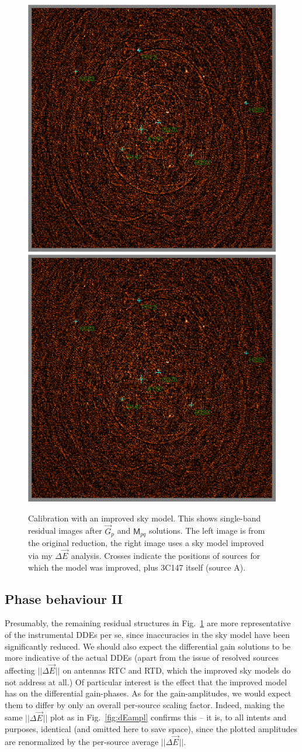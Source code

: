 \documentclass[]{aa}
\newcommand{\jones}[2]{\vec {#1}_{#2}}
\newcommand{\coh}[2]{\mathsf{{#1}}_{{#2}}}
\begin{document}
\begin{figure}
\begin{centering}
\includegraphics[width=.5\columnwidth]{spw2_oldmodel}%
\includegraphics[width=.5\columnwidth]{spw2_newmodel}\par
\end{centering}
\caption{\label{fig:residuals-newmodel}Calibration with an improved sky model. This shows single-band residual images after $\jones{G}{p}$ and $\coh{M}{pq}$ solutions. The left image is from the original reduction, the right image uses a sky model improved via my $\Delta\jones{E}{}$ analysis. Crosses indicate the positions of sources for which the model was improved, plus 3C147 itself (source A).}
\end{figure}

\subsection{Phase behaviour II\label{sec:de-analysis-phase2}}

Presumably, the remaining residual structures in Fig.~\ref{fig:residuals-newmodel} are more representative of the instrumental DDEs per se, since inaccuracies in the sky model have been significantly reduced. We should also expect the differential gain solutions to be more indicative of the actual DDEs (apart from the issue of resolved sources affecting $||\Delta\jones{E}{}||$ on antennas RTC and RTD, which the improved sky models do not address at all.) Of particular interest is the effect that the improved model has on the differential gain-phases. As for the gain-amplitudes, we would expect them to differ by only an overall per-source scaling factor. Indeed, making the same $||\Delta\jones{E}{}||$ plot as in Fig.~\ref{fig:dEampl} confirms this -- it is, to all intents and purposes, identical (and omitted here to save space), since the plotted amplitudes are renormalized by the per-source average $||\Delta\jones{E}{}||$.
\end{document}
